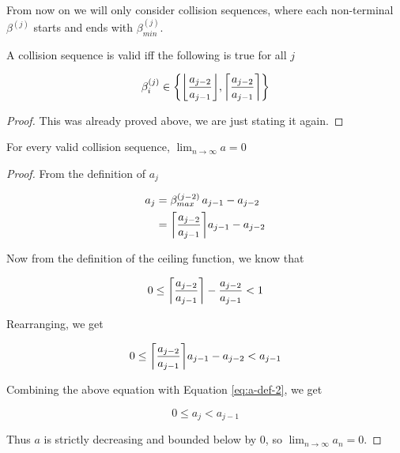 From now on we will only consider collision sequences, where each non-terminal $\beta^{(j)}$ starts and ends with $\beta^{(j)}_{min}$.


\begin{theorem}\label{thm:beta_i}
	A collision sequence is valid iff the following is true for all $j$

	\begin{equation}
		\beta^{(j)}_i \in \cbracket{\floor{\frac{a_{j-2}}{a_{j-1}}}, \ceil{\frac{a_{j-2}}{a_{j-1}}}}
	\end{equation}
\end{theorem}

\begin{proof}
	This was already proved above, we are just stating it again.
\end{proof}


\begin{theorem}
	For every valid collision sequence, $\lim_{n \to \infty} a = 0$
\end{theorem}

\begin{proof}
	From the definition of $a_j$

	\begin{align}\label{eq:a-def-2}
		a_j& = \beta^{(j-2)}_{max} \, a_{j-1} - a_{j-2}\\
		& =  \ceil{\frac{a_{j-2}}{a_{j-1}}} a_{j-1} - a_{j-2}
	\end{align}

	Now from the definition of the ceiling function, we know that

	\begin{equation}
		0 \le \ceil{\frac{a_{j-2}}{a_{j-1}}} - \frac{a_{j-2}}{a_{j-1}} < 1
	\end{equation}

	Rearranging, we get

	\begin{equation}
		0 \le \ceil{\frac{a_{j-2}}{a_{j-1}}} a_{j-1} - a_{j-2} < a_{j-1}
	\end{equation}

	Combining the above equation with Equation \ref{eq:a-def-2}, we get

	\begin{equation}
		0 \le a_j < a_{j-1}
	\end{equation}

	Thus $a$ is strictly decreasing and bounded below by 0, so $\lim_{n \to \infty} a_n = 0$.
\end{proof}